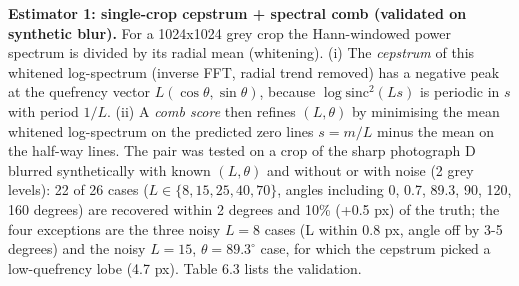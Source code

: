 \documentclass[10pt,a4paper]{article}
\begin{document}
\textbf{Estimator 1: single-crop cepstrum + spectral comb (validated on synthetic blur).} For a 1024x1024 grey crop the Hann-windowed power spectrum is divided by its radial mean (whitening). (i) The \textit{cepstrum} of this whitened log-spectrum (inverse FFT, radial trend removed) has a negative peak at the quefrency vector $L(\cos\theta,\sin\theta)$, because $\log\mathrm{sinc}^2(Ls)$ is periodic in $s$ with period $1/L$. (ii) A \textit{comb score} then refines $(L,\theta)$ by minimising the mean whitened log-spectrum on the predicted zero lines $s=m/L$ minus the mean on the half-way lines. The pair was tested on a crop of the sharp photograph D blurred synthetically with known $(L,\theta)$ and without or with noise (2 grey levels): 22 of 26 cases ($L\in\{8,15,25,40,70\}$, angles including 0, 0.7, 89.3, 90, 120, 160 degrees) are recovered within 2 degrees and 10\% (+0.5 px) of the truth; the four exceptions are the three noisy $L=8$ cases (L within 0.8 px, angle off by 3-5 degrees) and the noisy $L=15$, $\theta=89.3^\circ$ case, for which the cepstrum picked a low-quefrency lobe (4.7 px). Table 6.3 lists the validation.
\end{document}
